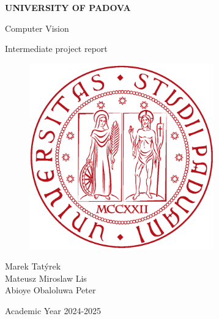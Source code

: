 \documentclass[english]{article}
\begin{document}
\begin{titlepage}

	\begin{center}
		\begin{Large} \textbf{UNIVERSITY OF PADOVA} \\
		\end{Large} \vspace{1cm}
		\vspace{3cm}
		\begin{Large} Computer Vision \end{Large}
		\par\end{center}

	\begin{center}
		\begin{Large}Intermediate project report\\
		\end{Large}
		\par\end{center}

	\begin{center}
		\vspace{2cm}
		\begin{figure}[!htb]
			\centering \includegraphics[width=8cm]{figures/unipd-logo.png}\\

		\end{figure}

		\par\end{center}

	\begin{center}
		\vspace{2cm}
		\begin{Large} Marek Tatýrek  \\
					Mateusz Miroslaw Lis   \\
					Abioye Obaloluwa Peter \\
		\end{Large} \vspace{2cm}
		\begin{Large} Academic Year 2024-2025 \end{Large}
		\par\end{center}

\end{titlepage}
\end{document}
